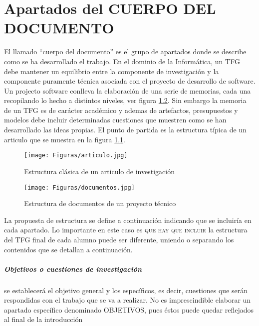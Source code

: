 
 \chapter{Apartados del CUERPO DEL DOCUMENTO}

El llamado ``cuerpo del documento'' es el grupo de apartados donde se describe como  se ha desarrollado el trabajo. En el dominio de la Informática, un TFG debe mantener un equilibrio entre la componente de investigación y la componente puramente técnica asociada con el proyecto de desarrollo de software. Un projecto software conlleva la elaboración de una serie de memorias, cada una recopilando lo hecho a distintos niveles, ver figura \ref{fig:report}. Sin embargo la memoria de un TFG es de carácter académico y ademas de artefactos, presupuestos y modelos debe incluir determinadas cuestiones que muestren como se han desarrollado las ideas propias. El punto de partida es la estructura típica de un articulo que se muestra en la figura \ref{fig:articulo}.


\begin{figure}

	\begin{center}
		\texttt{[image: Figuras/articulo.jpg]}
	\end{center}
	\caption{Estructura clásica de un articulo de investigación}
	\label{fig:articulo}
\end{figure}


\begin{figure}  
 	\begin{center}
        \texttt{[image: Figuras/documentos.jpg]}
        	\end{center}
        \caption{Estructura de documentos de un proyecto técnico}
    \label{fig:report}
\end{figure}


La propuesta de estructura se define a continuación indicando que se incluiría en cada apartado. Lo importante en este caso es \textsc{que hay que incluir} la estructura del TFG final de cada alumno puede ser diferente, uniendo o separando los contenidos que se detallan a continuación. 

\paragraph{Objetivos o cuestiones de investigación}

se establecerá el objetivo general y los específicos, es decir, cuestiones que serán respondidas con el trabajo que se va a realizar. No es
imprescindible elaborar un apartado específico denominado OBJETIVOS, pues éstos puede quedar reflejados al final de la
introducción

